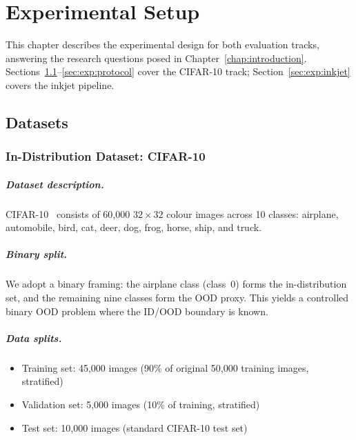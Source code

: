 \cleardoubleoddpage
\chapter{Experimental Setup}
\label{chap:experimental-setup}

This chapter describes the experimental design for both evaluation tracks,
answering the research questions posed in
Chapter~\ref{chap:introduction}.
Sections~\ref{sec:exp:datasets}--\ref{sec:exp:protocol} cover the
CIFAR-10 track; Section~\ref{sec:exp:inkjet} covers the inkjet pipeline.


\section{Datasets}
\label{sec:exp:datasets}

\subsection{In-Distribution Dataset: CIFAR-10}
\label{sec:exp:datasets:id}

\paragraph{Dataset description.}
CIFAR-10~\citep{krizhevsky2009learning} consists of 60,000
$32 \times 32$ colour images across 10 classes: airplane, automobile,
bird, cat, deer, dog, frog, horse, ship, and truck.

\paragraph{Binary split.}
We adopt a binary framing: the airplane class (class~0) forms the
in-distribution set, and the remaining nine classes form the OOD proxy.
This yields a controlled binary OOD problem where the ID/OOD boundary is
known.

\paragraph{Data splits.}
\begin{itemize}
  \item Training set: 45,000 images (90\% of original 50,000 training
        images, stratified)
  \item Validation set: 5,000 images (10\% of training, stratified)
  \item Test set: 10,000 images (standard CIFAR-10 test set)
\end{itemize}

